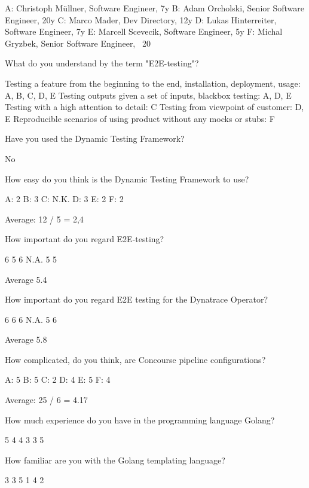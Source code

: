 A: Christoph Müllner, Software Engineer, 7y
B: Adam Orcholski, Senior Software Engineer, 20y
C: Marco Mader, Dev Directory, 12y
D: Lukas Hinterreiter, Software Engineer, 7y
E: Marcell Scevecik, Software Engineer, 5y
F: Michal Gryzbek, Senior Software Engineer, ~20

What do you understand by the term "E2E-testing"?

Testing a feature from the beginning to the end, installation, deployment, usage: A, B, C, D, E
Testing outputs given a set of inputs, blackbox testing: A, D, E
Testing with a high attention to detail: C
Testing from viewpoint of customer: D, E
Reproducible scenarios of using product without any mocks or stubs: F


Have you used the Dynamic Testing Framework?

No


How easy do you think is the Dynamic Testing Framework to use?

A: 2
B: 3
C: N.K.
D: 3
E: 2
F: 2

Average: 12 / 5 = 2,4


How important do you regard E2E-testing?

6
5
6
N.A.
5
5

Average 5.4

How important do you regard E2E testing for the Dynatrace Operator?

6
6
6
N.A.
5
6

Average 5.8

How complicated, do you think, are Concourse pipeline configurations?

A: 5
B: 5
C: 2
D: 4
E: 5
F: 4

Average: 25 / 6 = 4.17

How much experience do you have in the programming language Golang?

5
4
4
3
3
5

How familiar are you with the Golang templating language?

3
3
5
1
4
2
